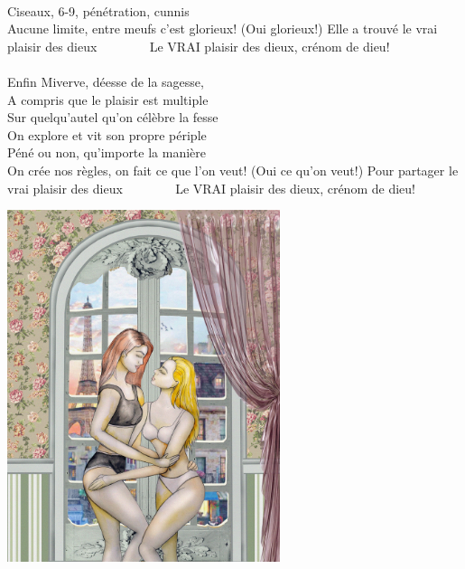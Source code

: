 \\Ciseaux, 6-9, pénétration, cunnis
\\Aucune limite, entre meufs c'est glorieux! (Oui glorieux!)
{Elle a trouvé le vrai plaisir des dieux  ~~~~~~~}
Le VRAI plaisir des dieux, crénom de dieu!
\\\\Enfin Miverve, déesse de la sagesse,
\\A compris que le plaisir est multiple
\\Sur quelqu'autel qu'on célèbre la fesse
\\On explore et vit son propre périple
\\Péné ou non, qu'importe la manière
\\On crée nos règles, on fait ce que l'on veut! (Oui ce qu'on veut!)
{Pour partager le vrai plaisir des dieux  ~~~~~~~}
Le VRAI plaisir des dieux, crénom de dieu!
\\
\begin{center}
   \includegraphics[width=0.6\textwidth]{images/brev76.png}
 \end{center}

\breakpage